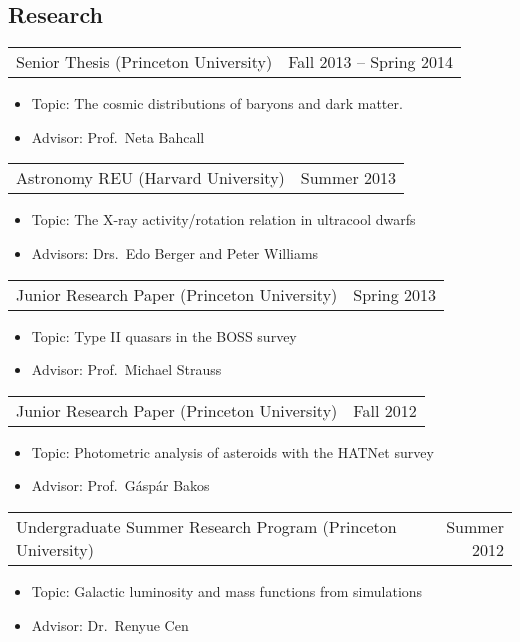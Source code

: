 \documentclass{res}
\begin{document}
\begin{resume}
\section{\textbf{Research}}
\begin{tabular}{@{}p{4in} r}
  Senior Thesis (Princeton University) & Fall 2013 -- Spring 2014
\end{tabular}
\begin{itemize} \itemsep -2pt
\item[] Topic: The cosmic distributions of baryons and dark matter.
\item[] Advisor: Prof.~Neta Bahcall
\end{itemize}
\begin{tabular}{@{}p{4in} r}
  Astronomy REU (Harvard University) & Summer 2013
\end{tabular}
\begin{itemize} \itemsep -2pt
\item[] Topic: The X-ray activity/rotation relation in ultracool
  dwarfs
\item[] Advisors: Drs.~Edo Berger and Peter Williams
\end{itemize}
\begin{tabular}{@{}p{4in} r}
  Junior Research Paper (Princeton University) & Spring 2013
\end{tabular}
\begin{itemize} \itemsep -2pt
\item[] Topic: Type II quasars in the BOSS survey
\item[] Advisor: Prof.~Michael Strauss
\end{itemize}
\begin{tabular}{@{}p{4in} r}
  Junior Research Paper (Princeton University) & Fall 2012
\end{tabular}
\begin{itemize} \itemsep -2pt
\item[] Topic: Photometric analysis of asteroids with the HATNet
  survey
\item[] Advisor: Prof.~G\'asp\'ar Bakos
\end{itemize}
\begin{tabular}{@{}p{4in} r}
  Undergraduate Summer Research Program (Princeton University) &
  Summer 2012
\end{tabular}
\begin{itemize} \itemsep -2pt
\item[] Topic: Galactic luminosity and mass functions from simulations
\item[] Advisor: Dr.~Renyue Cen
\end{itemize}


\end{resume}
\end{document}
